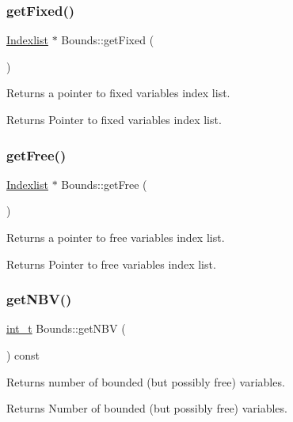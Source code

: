 \subsubsection{\texorpdfstring{get\+Fixed()}{getFixed()}}
{\footnotesize\ttfamily \hyperlink{class_indexlist}{Indexlist} $\ast$ Bounds\+::get\+Fixed (\begin{DoxyParamCaption}{ }\end{DoxyParamCaption})\hspace{0.3cm}{\ttfamily [inline]}}

Returns a pointer to fixed variables index list. \begin{DoxyReturn}{Returns}
Pointer to fixed variables index list. 
\end{DoxyReturn}
\mbox{\label{class_bounds_abc066244b45e507c77edb14ad57a8370}} 
\subsubsection{\texorpdfstring{get\+Free()}{getFree()}}
{\footnotesize\ttfamily \hyperlink{class_indexlist}{Indexlist} $\ast$ Bounds\+::get\+Free (\begin{DoxyParamCaption}{ }\end{DoxyParamCaption})\hspace{0.3cm}{\ttfamily [inline]}}

Returns a pointer to free variables index list. \begin{DoxyReturn}{Returns}
Pointer to free variables index list. 
\end{DoxyReturn}
\mbox{\label{class_bounds_a83878b515f0ecbf38f6cbea483711f17}} 
\subsubsection{\texorpdfstring{get\+N\+B\+V()}{getNBV()}}
{\footnotesize\ttfamily \hyperlink{_types_8hpp_ab6fd6105e64ed14a0c9281326f05e623}{int\+\_\+t} Bounds\+::get\+N\+BV (\begin{DoxyParamCaption}{ }\end{DoxyParamCaption}) const\hspace{0.3cm}{\ttfamily [inline]}}

Returns number of bounded (but possibly free) variables. \begin{DoxyReturn}{Returns}
Number of bounded (but possibly free) variables. 
\end{DoxyReturn}
\mbox{\label{class_bounds_ad67174ea575c43b1dd4b9da24f3a8a2a}} 
